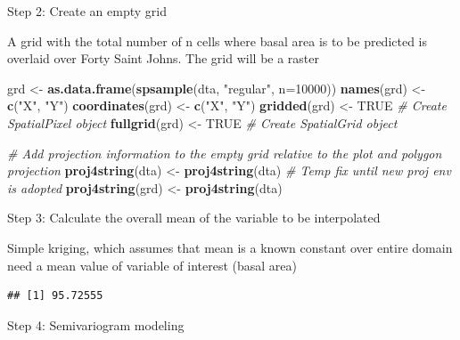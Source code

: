 \documentclass[
]{book}
\newenvironment{Shaded}{\begin{snugshade}}{\end{snugshade}}
\newcommand{\AttributeTok}[1]{\textcolor[rgb]{0.13,0.29,0.53}{#1}}
\newcommand{\CommentTok}[1]{\textcolor[rgb]{0.56,0.35,0.01}{\textit{#1}}}
\newcommand{\ConstantTok}[1]{\textcolor[rgb]{0.56,0.35,0.01}{#1}}
\newcommand{\DecValTok}[1]{\textcolor[rgb]{0.00,0.00,0.81}{#1}}
\newcommand{\FunctionTok}[1]{\textcolor[rgb]{0.13,0.29,0.53}{\textbf{#1}}}
\newcommand{\NormalTok}[1]{#1}
\newcommand{\OtherTok}[1]{\textcolor[rgb]{0.56,0.35,0.01}{#1}}
\newcommand{\SpecialCharTok}[1]{\textcolor[rgb]{0.81,0.36,0.00}{\textbf{#1}}}
\newcommand{\StringTok}[1]{\textcolor[rgb]{0.31,0.60,0.02}{#1}}
\begin{document}
Step 2: Create an empty grid

A grid with the total number of n cells where basal area is to be predicted is overlaid over Forty Saint Johns. The grid will be a raster

\begin{Shaded}
\begin{Highlighting}[]
\NormalTok{grd              }\OtherTok{\textless{}{-}} \FunctionTok{as.data.frame}\NormalTok{(}\FunctionTok{spsample}\NormalTok{(dta, }\StringTok{"regular"}\NormalTok{, }\AttributeTok{n=}\DecValTok{10000}\NormalTok{))}
\FunctionTok{names}\NormalTok{(grd)       }\OtherTok{\textless{}{-}} \FunctionTok{c}\NormalTok{(}\StringTok{"X"}\NormalTok{, }\StringTok{"Y"}\NormalTok{)}
\FunctionTok{coordinates}\NormalTok{(grd) }\OtherTok{\textless{}{-}} \FunctionTok{c}\NormalTok{(}\StringTok{"X"}\NormalTok{, }\StringTok{"Y"}\NormalTok{)}
\FunctionTok{gridded}\NormalTok{(grd)     }\OtherTok{\textless{}{-}} \ConstantTok{TRUE}  \CommentTok{\# Create SpatialPixel object}
\FunctionTok{fullgrid}\NormalTok{(grd)    }\OtherTok{\textless{}{-}} \ConstantTok{TRUE}  \CommentTok{\# Create SpatialGrid object}

\CommentTok{\# Add projection information to the empty grid relative to the plot and polygon projection }
\FunctionTok{proj4string}\NormalTok{(dta) }\OtherTok{\textless{}{-}} \FunctionTok{proj4string}\NormalTok{(dta) }\CommentTok{\# Temp fix until new proj env is adopted}
\FunctionTok{proj4string}\NormalTok{(grd) }\OtherTok{\textless{}{-}} \FunctionTok{proj4string}\NormalTok{(dta)}
\end{Highlighting}
\end{Shaded}

Step 3: Calculate the overall mean of the variable to be interpolated

Simple kriging, which assumes that mean is a known constant over entire domain need a mean value of variable of interest (basal area)

\begin{Shaded}
\end{Shaded}

\begin{verbatim}
## [1] 95.72555
\end{verbatim}

Step 4: Semivariogram modeling
\end{document}

